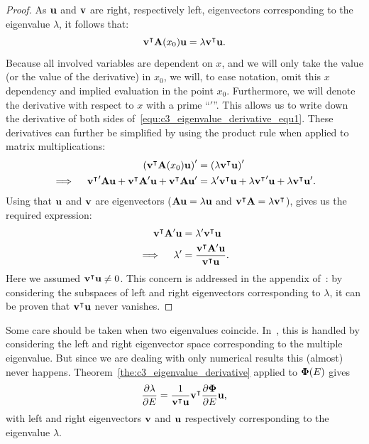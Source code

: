 \begin{proof}
  As $\vb{u}$ and $\vb{v}$ are right, respectively left, eigenvectors corresponding to the eigenvalue $\lambda$, it follows that:
  \begin{equation}\label{equ:c3_eigenvalue_derivative_equ1}
    {\vb{v}}^\intercal\vb{A}(x_0)\vb{u}  = \lambda {\vb{v}}^\intercal\vb{u}\text{.}
  \end{equation}
  Because all involved variables are dependent on $x$, and we will only take the value (or the value of the derivative) in $x_0$, we will, to ease notation, omit this $x$ dependency and implied evaluation in the point $x_0$. Furthermore, we will denote the derivative with respect to $x$ with a prime ``$'$''. This allows us to write down the derivative of both sides of~\eqref{equ:c3_eigenvalue_derivative_equ1}. These derivatives can further be simplified by using the product rule when applied to matrix multiplications:
  \begin{align*}
    \left({\vb{v}}^\intercal\vb{A}(x_0)\vb{u}\right)'                                                                    & = \left(\lambda {\vb{v}}^\intercal\vb{u}\right)'                                                                      \\
    \implies \quad {{\vb{v}}^\intercal}'\vb{A}\vb{u} + {\vb{v}}^\intercal\vb{A}'\vb{u} + {\vb{v}}^\intercal\vb{A}\vb{u}' & = \lambda' {\vb{v}}^\intercal\vb{u} + \lambda {{\vb{v}}^\intercal}'\vb{u} + \lambda {\vb{v}}^\intercal\vb{u}'\text{.}
  \end{align*}
  Using that $\vb{u}$ and $\vb{v}$ are eigenvectors ($\vb{A} \vb{u} = \lambda \vb{u}$ and ${\vb{v}}^\intercal\vb{A} = \lambda {\vb{v}}^\intercal$), gives us the required expression:
  \begin{align*}
    {\vb{v}}^\intercal\vb{A}'\vb{u} & = \lambda' {\vb{v}}^\intercal\vb{u}                                         \\
    \implies \quad \lambda'         & = \frac{{\vb{v}}^\intercal\vb{A}'\vb{u}}{{\vb{v}}^\intercal\vb{u}} \text{.}
  \end{align*}
  Here we assumed ${\vb{v}}^\intercal\vb{u} \neq 0$. This concern is addressed in the appendix of~\cite{lancaster_eigenvalues_1964}: by considering the subspaces of left and right eigenvectors corresponding to $\lambda$, it can be proven that ${\vb{v}}^\intercal\vb{u}$ never vanishes.
\end{proof}

Some care should be taken when two eigenvalues coincide. In~\cite{lancaster_eigenvalues_1964}, this is handled by considering the left and right eigenvector space corresponding to the multiple eigenvalue. But since we are dealing with only numerical results this (almost) never happens. Theorem~\ref{the:c3_eigenvalue_derivative} applied to $\vb{\Phi}(E)$ gives
$$
  \pdv{\lambda}{E} = \frac{1}{{\vb{v}}^\intercal\vb{u}}{\vb{v}}^\intercal \pdv{\vb{\Phi}}{E} \vb{u} \text{,}
$$
with left and right eigenvectors $\vb{v}$ and $\vb{u}$ respectively corresponding to the eigenvalue $\lambda$.

